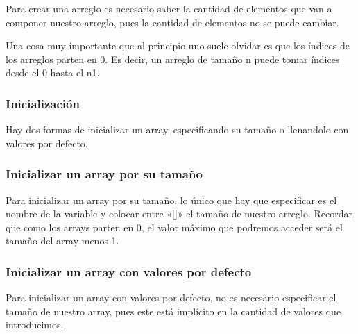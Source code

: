 \documentclass[letterpaper,10pt,spanish]{sphinxmanual}
\begin{document}
Para crear una arreglo es necesario saber la cantidad de elementos que van a componer nuestro arreglo, pues la cantidad de elementos no se puede cambiar.

Una cosa muy importante que al principio uno suele olvidar es que los índices de los arreglos parten en 0. Es decir, un arreglo de tamaño n puede tomar índices desde el 0 hasta el n\sphinxhyphen{}1.


\subsubsection{Inicialización}
\label{\detokenize{edd/lineales:inicializacion}}
Hay dos formas de inicializar un array, especificando su tamaño o llenandolo con valores por defecto.


\subsubsection{Inicializar un array por su tamaño}
\label{\detokenize{edd/lineales:inicializar-un-array-por-su-tamano}}
Para inicializar un array por su tamaño, lo único que hay que especificar es el nombre de la variable y colocar entre «{[}{]}» el tamaño de nuestro arreglo. Recordar que como los arrays parten en 0, el valor máximo que podremos acceder será el tamaño del array menos 1.

\begin{sphinxVerbatim}[commandchars=\\\{\},numbers=left,firstnumber=1,stepnumber=1]
     \PYG{p}{[}\PYG{p}{]}
\end{sphinxVerbatim}


\subsubsection{Inicializar un array con valores por defecto}
\label{\detokenize{edd/lineales:inicializar-un-array-con-valores-por-defecto}}
Para inicializar un array con valores por defecto, no es necesario especificar el tamaño de nuestro array, pues este está implícito en la cantidad de valores que introducimos.

\begin{sphinxVerbatim}[commandchars=\\\{\},numbers=left,firstnumber=1,stepnumber=1]
     \PYG{p}{[}\PYG{p}{]}     
\end{sphinxVerbatim}
\end{document}
